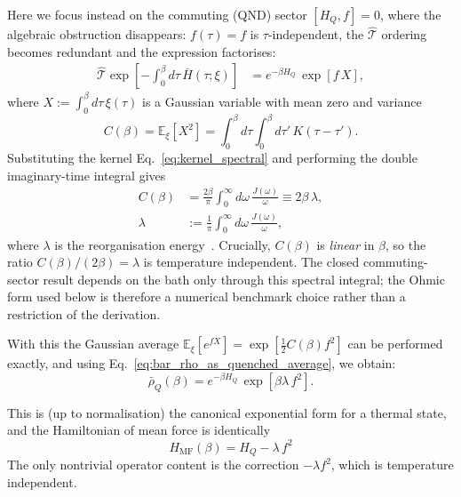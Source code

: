 \documentclass[aps,prl,twocolumn,superscriptaddress,showpacs,floatfix]{revtex4-2}
\begin{document}
Here we focus instead on the commuting (QND) sector $[H_Q,f]=0$, where the algebraic obstruction disappears: $f(\tau)=f$ is $\tau$-independent, the $\hat{\mathcal{T}}$ ordering becomes redundant and the expression factorises:
\begin{align}
    \hat{\mathcal{T}}\exp\!\left[-\int_0^\beta d\tau\,\bar{H}(\tau;\xi)\right]
    &=
    e^{-\beta H_Q}\, \exp\!\left[f\,X\right],
    \label{eq:tilde_rho_commuting_factorised}
\end{align}
where $X:=\int_0^\beta d\tau\,\xi(\tau)$ is a Gaussian variable with mean zero and variance
\begin{equation}
    C(\beta) = \mathbb E_\xi[X^2] = \int_0^\beta d\tau\int_0^\beta d\tau'\,K(\tau-\tau').
    \label{eq:Cbeta_def}
\end{equation}
Substituting the kernel Eq.~\eqref{eq:kernel_spectral} and performing the double
imaginary-time integral gives
\begin{align}
    C(\beta)
    &=\frac{2\beta}{\pi}\int_0^\infty d\omega\,\frac{J(\omega)}{\omega}
    \equiv 2\beta\,\lambda,
    \nonumber\\
    \lambda&:=\frac{1}{\pi}\int_0^\infty d\omega\,\frac{J(\omega)}{\omega},
    \label{eq:Cbeta_explicit}
\end{align}
where $\lambda$ is the reorganisation energy~\cite{weissQuantumDissipativeSystems2012, leggettDynamicsDissipativeTwostate1987}.
Crucially, $C(\beta)$ is \emph{linear} in $\beta$, so the ratio $C(\beta)/(2\beta)=\lambda$ is temperature independent. The closed commuting-sector result depends on the bath only through this spectral integral; the Ohmic form used below is therefore a numerical benchmark choice rather than a restriction of the derivation.

With this the Gaussian average $\mathbb E_\xi[e^{f X}] = \exp[\frac{1}{2}C(\beta)f^2]$ can be performed exactly, and using Eq.~\eqref{eq:bar_rho_as_quenched_average}, we obtain:
\begin{equation}
    \bar\rho_Q(\beta) = e^{-\beta H_Q}\,\exp\!\left[\beta\lambda\,f^2\right].
    \label{eq:bar_rho_commuting_closed}
\end{equation}

This is (up to normalisation) the canonical exponential form for a thermal state, and the Hamiltonian of mean force is identically
\begin{equation}
    H_{\mathrm{MF}}(\beta) = H_Q -\lambda\,f^2 
    \label{eq:HMF_commuting_final}
\end{equation}
The only nontrivial operator content is the correction $-\lambda f^2$, which is temperature independent.
\end{document}
